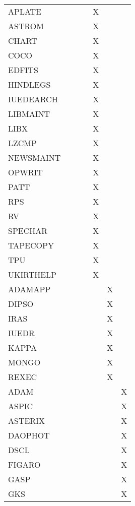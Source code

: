 {\begin{table}
\begin{center}
\begin{tabular}{||l||c|c|c|c|c||c||}
APLATE    &   &   &   & X &   &   \\
ASTROM    &   &   &   & X &   &   \\
CHART     &   &   &   & X &   &   \\
COCO      &   &   &   & X &   &   \\
EDFITS    &   &   &   & X &   &   \\
HINDLEGS  &   &   &   & X &   &   \\
IUEDEARCH &   &   &   & X &   &   \\
LIBMAINT  &   &   &   & X &   &   \\
LIBX      &   &   &   & X &   &   \\
LZCMP     &   &   &   & X &   &   \\
NEWSMAINT &   &   &   & X &   &   \\
OPWRIT    &   &   &   & X &   &   \\
PATT      &   &   &   & X &   &   \\
RPS       &   &   &   & X &   &   \\
RV        &   &   &   & X &   &   \\
SPECHAR   &   &   &   & X &   &   \\
TAPECOPY  &   &   &   & X &   &   \\
TPU       &   &   &   & X &   &   \\
UKIRTHELP &   &   &   & X &   &   \\
\hline
ADAMAPP   &   &   &   &   & X &   \\
DIPSO     &   &   &   &   & X &   \\
IRAS      &   &   &   &   & X &   \\
IUEDR     &   &   &   &   & X &   \\
KAPPA     &   &   &   &   & X &   \\
MONGO     &   &   &   &   & X &   \\
REXEC     &   &   &   &   & X &   \\
\hline
\hline
ADAM      &   &   &   &   &   & X \\
ASPIC     &   &   &   &   &   & X \\
ASTERIX   &   &   &   &   &   & X \\
DAOPHOT   &   &   &   &   &   & X \\
DSCL      &   &   &   &   &   & X \\
FIGARO    &   &   &   &   &   & X \\
GASP      &   &   &   &   &   & X \\
GKS       &   &   &   &   &   & X \\

\end{tabular}
\end{center}
\end{table}}
